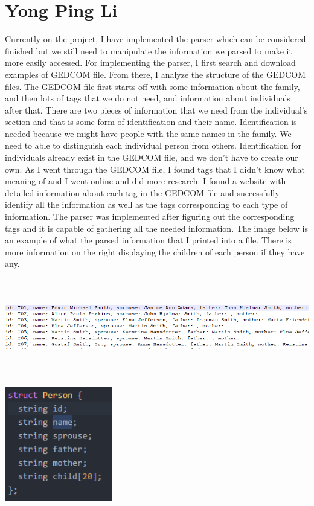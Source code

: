 \documentclass[onecolumn, draftclsnofoot, 10pt, compsoc]{IEEEtran}
\begin{document}
\section{Yong Ping Li}
\begin{singlespace}
Currently on the project, I have implemented the parser which can be considered finished but we still need to manipulate the information we parsed to make it more easily accessed. For implementing the parser, I first search and download examples of GEDCOM file. From there, I analyze the structure of the GEDCOM files. The GEDCOM file first starts off with some information about the family, and then lots of tags that we do not need, and information about individuals after that. There are two pieces of information that we need from the individual's section and that is some form of identification and their name. Identification is needed because we might have people with the same names in the family. We need to able to distinguish each individual person from others. Identification for individuals already exist in the GEDCOM file, and we don't have to create our own. As I went through the GEDCOM file, I found tags that I didn't know what meaning of and I went online and did more research. I found a website with detailed information about each tag in the GEDCOM file and successfully identify all the information as well as the tags corresponding to each type of information. The parser was implemented after figuring out the corresponding tags and it is capable of gathering all the needed information. The image below is an example of what the parsed information that I printed into a file. There is more information on the right displaying the children of each person if they have any.
\newline
\includegraphics[height=5cm]{data}
\includegraphics[height=5cm]{struct}

\end{singlespace}
\end{document}
